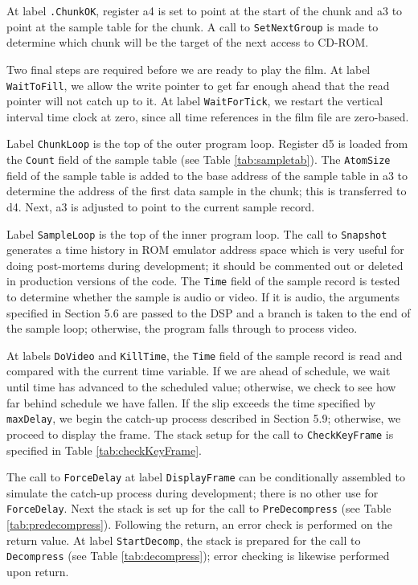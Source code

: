 \documentclass[12pt,letterpaper,twoside]{article}
\begin{document}
At label \texttt{.ChunkOK}, register a4 is set to point at the start of the chunk and a3 to point at the sample table for the chunk. A call to \texttt{SetNextGroup} is made to determine which chunk will be the target of the next access to CD-ROM.

Two final steps are required before we are ready to play the film. At label \texttt{WaitToFill}, we allow the write pointer to get far enough ahead that the read pointer will not catch up to it. At label \texttt{WaitForTick}, we restart the vertical interval time clock at zero, since all time references in the film file are zero-based.

Label \texttt{ChunkLoop} is the top of the outer program loop. Register d5 is loaded from the \texttt{Count} field of the sample table (see Table \ref{tab:sampletab}). The \texttt{AtomSize} field of the sample table is added to the base address of the sample table in a3 to determine the address of the first data sample in the chunk; this is transferred to d4. Next, a3 is adjusted to point to the current sample record.

Label \texttt{SampleLoop} is the top of the inner program loop. The call to \texttt{Snapshot} generates a time history in ROM emulator address space which is very useful for doing post-mortems during development; it should be commented out or deleted in production versions of the code. The \texttt{Time} field of the sample record is tested to determine whether the sample is audio or video. If it is audio, the arguments specified in Section 5.6 are passed to the DSP and a branch is taken to the end of the sample loop; otherwise, the program falls through to process video.

At labels \texttt{DoVideo} and \texttt{KillTime}, the \texttt{Time} field of the sample record is read and compared with the current time variable. If we are ahead of schedule, we wait until time has advanced to the scheduled value; otherwise, we check to see how far behind schedule we have fallen. If the slip exceeds the time specified by \texttt{maxDelay}, we begin the catch-up process described in Section 5.9; otherwise, we proceed to display the frame. The stack setup for the call to \texttt{CheckKeyFrame} is specified in Table \ref{tab:checkKeyFrame}.

The call to \texttt{ForceDelay} at label \texttt{DisplayFrame} can be conditionally assembled to simulate the catch-up process during development; there is no other use for \texttt{ForceDelay}. Next the stack is set up for the call to \texttt{PreDecompress} (see Table \ref{tab:predecompress}). Following the return, an error check is performed on the return value. At label \texttt{StartDecomp}, the stack is prepared for the call to \texttt{Decompress} (see Table \ref{tab:decompress}); error checking is likewise performed upon return.
\end{document}
